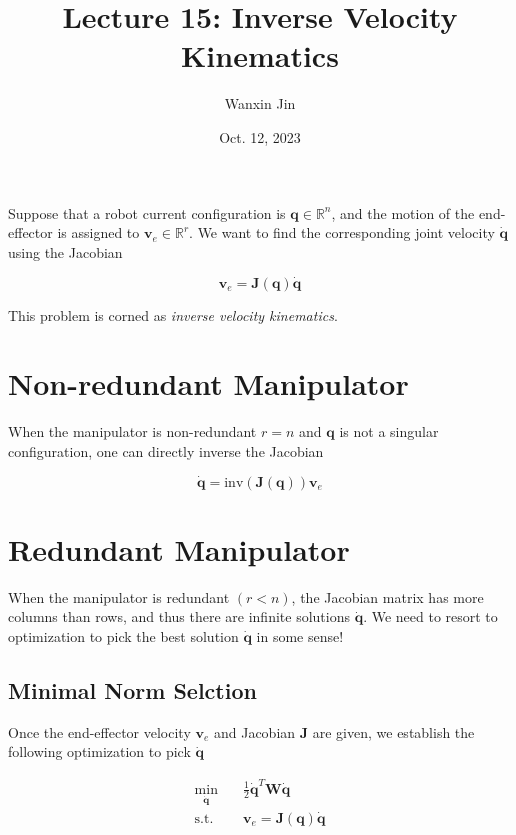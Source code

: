\documentclass[10pt]{article}
\begin{document}
\title{Lecture 15: Inverse Velocity Kinematics}
\date{Oct. 12, 2023}
\author{Wanxin Jin}
\maketitle




Suppose that a robot current configuration is $\boldsymbol{q}\in\mathbb{R}^n$, and the motion of the end-effector is assigned to $\boldsymbol{v}_{e}\in\mathbb{R}^r$. We want to find the corresponding joint velocity $\dot{\boldsymbol{q}}$ using the Jacobian

$$
 \boldsymbol{v}_{e}=\boldsymbol{J}(\boldsymbol{q})\dot{\boldsymbol{q}}
$$

This problem is corned as \emph{inverse velocity kinematics}.



\section{Non-redundant Manipulator}

When the  manipulator is non-redundant $r=n$ and $\boldsymbol{q}$ is not a singular configuration, one can directly inverse the Jacobian 

$$
 \dot{\boldsymbol{q}}=\text{inv}(\boldsymbol{J}(\boldsymbol{q})) \boldsymbol{v}_{e}
 $$

\section{Redundant Manipulator}

When the manipulator is redundant $(r<n)$, the Jacobian matrix has more columns than rows, and thus there are infinite solutions $\dot{\boldsymbol{q}}$. We need to resort to optimization to pick the best solution  $\dot{\boldsymbol{q}}$ in some sense! 

\subsection{Minimal Norm Selction}

Once the end-effector velocity $\boldsymbol{v}_{e}$ and Jacobian $\boldsymbol{J}$ are given, we establish the following optimization to pick $\dot{\boldsymbol{q}}$

$$
    \begin{aligned}
        \min_{\dot{\boldsymbol{q}}} \quad &\frac{1}{2} \dot{\boldsymbol{q}}^{T} \boldsymbol{W} \dot{\boldsymbol{q}}\\
        \text{s.t.}\quad & \boldsymbol{v}_{e}  =\boldsymbol{J}(\boldsymbol{q}) \dot{\boldsymbol{q}}
    \end{aligned}
    $$
\end{document}
